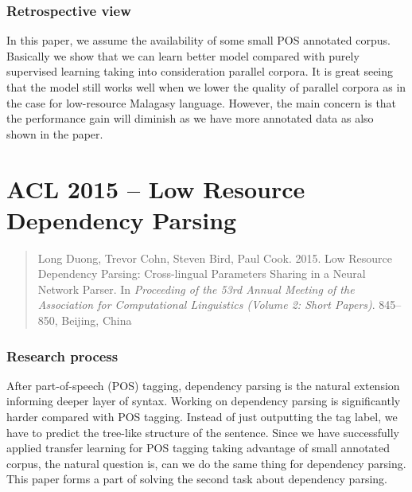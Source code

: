 \documentclass[12pt,twoside,final,hidelinks]{ltthesis}
\theoremstyle{definition}
\begin{document}
\subsubsection{Retrospective view}
In this paper, we assume the availability of some small POS annotated corpus. Basically we show that we can learn better model compared with purely 
supervised learning taking into consideration parallel corpora. It is great seeing that the model still works well when we lower the quality of parallel 
corpora as in the case for low-resource Malagasy language. However, the main concern is that the performance gain will diminish as we have more annotated 
data as also shown in the paper.%

%




\section{ACL 2015 -- Low Resource Dependency Parsing}
\label{sec:acl15}

\begin{quote}
Long Duong, Trevor Cohn, Steven Bird, Paul Cook. 2015. Low Resource Dependency Parsing: Cross-lingual Parameters Sharing in a Neural Network Parser. In\textit{ Proceeding of the 53rd Annual Meeting of the Association for Computational Linguistics (Volume 2: Short Papers)}.  845--850, Beijing, China
\end{quote}
\subsubsection{Research process}
After part-of-speech (POS) tagging, dependency parsing is the natural extension informing deeper layer of syntax. Working on dependency parsing is significantly 
harder compared with POS tagging. Instead of just outputting the tag label, we have to predict the tree-like structure of the sentence. Since we have successfully 
applied transfer learning for POS tagging taking advantage of small annotated corpus, the natural question is, can we do the same thing for dependency 
parsing. This paper forms a part of solving the second task about dependency parsing. 
\end{document}
